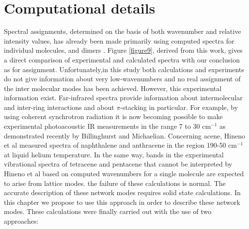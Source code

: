 \section{Computational details}


Spectral assignments, determined on the basis of both wavenumber and relative intensity values, has already been made primarily using computed spectra for individual molecules, and dimers \cite{spillebout2014discerning}.
Figure \ref{figure9}, derived from this work, gives a direct comparison of experimental and calculated spectra with our conclusion as for assignment. Unfortunately,in this study both calculations and experiments do not give information about very low-wavenumbers and no real assignment of the inter molecular modes has been achieved. However, this experimental information exist. Far-infrared spectra provide information about intermolecular and inter-ring interactions and about $\pi$-stacking in particular. For example, by using coherent synchrotron radiation it is now becoming possible to make experimental photoacoustic IR measurements in the range 7 to 30 cm$^{-1}$ as demonstrated recently by Billinghurst and Michaelian\cite{billinghurst2010photoacoustic}. Concerning acene, Hineno et al \cite{hineno1975far}  measured spectra of naphthalene and anthracene in the region 190-50 cm$^{-1}$ at liquid helium temperature. In the same way, bands in the experimental vibrational spectra of tetracene and pentacene that cannot be interpreted by Hineno et al based on computed wavenumbers for a single molecule are expected to arise from lattice modes. the failure of these calculations is normal. The accurate description of these network modes requires solid state calculations. In this chapter we propose to use this approach in order to describe these network modes. These calculations were finally carried out with the use of two approaches:\\




